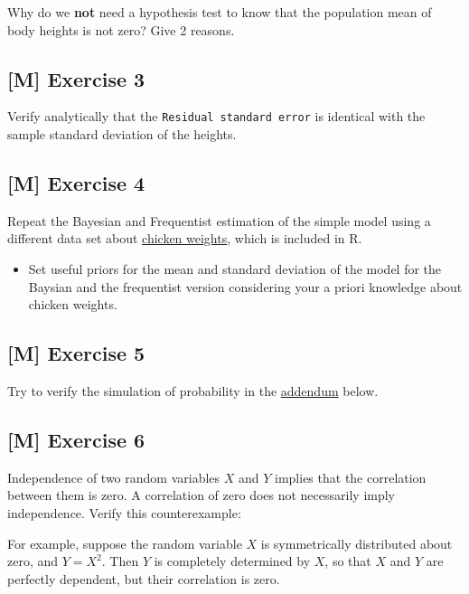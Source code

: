 \documentclass[
]{book}
\providecommand{\tightlist}{%
  \setlength{\itemsep}{0pt}\setlength{\parskip}{0pt}}
\begin{document}
Why do we \textbf{not} need a hypothesis test to know that the population mean of body heights is not zero?
Give 2 reasons.

\subsection{{[}M{]} Exercise 3}\label{exercise3_Intro}

Verify analytically that the \texttt{Residual\ standard\ error} is identical with
the sample standard deviation of the heights.

\subsection{{[}M{]} Exercise 4}\label{exercise4_Intro}

Repeat the Bayesian and Frequentist estimation of the simple model using a different data set about
\href{https://stat.ethz.ch/R-manual/R-devel/library/datasets/html/ChickWeight.html}{chicken weights},
which is included in R.

\begin{itemize}
\tightlist
\item
  Set useful priors for the mean and standard deviation of the model
  for the Baysian and the frequentist version considering
  your a priori knowledge about chicken weights.
\end{itemize}

\subsection{{[}M{]} Exercise 5}\label{exercise5_Intro}

Try to verify the simulation of probability in the \hyperref[addendum]{addendum} below.

\subsection{{[}M{]} Exercise 6}\label{exercise6_Intro}

Independence of two random variables \(X\) and \(Y\) implies that the
correlation between them is zero.
A correlation of zero does not necessarily imply independence. Verify this
counterexample:

For example, suppose the random variable \(X\) is symmetrically distributed about zero,
and \(Y = X^2\). Then \(\mathit{Y}\) is completely determined by \(X\), so that
\(\mathit{X}\) and \(\mathit{Y}\) are perfectly dependent, but their correlation is zero.
\end{document}
